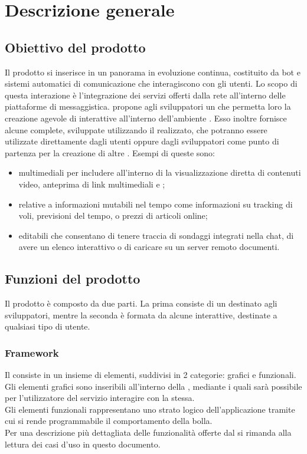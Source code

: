 \section{Descrizione generale}
\subsection{Obiettivo del prodotto}
Il prodotto si inserisce in un panorama in evoluzione continua, costituito da bot e sistemi automatici di comunicazione che interagiscono con gli utenti.
Lo scopo di  questa interazione è l'integrazione dei servizi offerti dalla rete all'interno delle piattaforme di messaggistica. 
\ProjectName{} propone agli sviluppatori un  che permetta loro la creazione agevole di  interattive all'interno dell'ambiente . Esso inoltre fornisce alcune  complete, sviluppate utilizzando il  realizzato, che potranno essere utilizzate direttamente dagli utenti oppure dagli sviluppatori come punto di partenza per la creazione di altre .
Esempi di queste sono: 
\begin{itemize}
	\item {} multimediali per includere all'interno di  la visualizzazione diretta di contenuti video, anteprima di link multimediali e ;
	\item {} relative a informazioni mutabili nel tempo come informazioni su tracking di voli, previsioni del tempo, o prezzi di articoli online;
	\item {} editabili che consentano di tenere traccia di sondaggi integrati nella chat, di avere un elenco interattivo o di caricare su un server remoto documenti.
\end{itemize}

\subsection{Funzioni del prodotto}
Il prodotto è composto da due parti. La prima consiste di un  destinato agli sviluppatori, mentre la seconda è formata da alcune  interattive, destinate a qualsiasi tipo di utente.

\subsubsection{Framework}
Il  consiste in un insieme di elementi, suddivisi in 2 categorie: grafici e funzionali.\\
Gli elementi grafici sono  inseribili all'interno della , mediante i quali sarà possibile per l'utilizzatore del servizio interagire con la  stessa.\\
Gli elementi funzionali rappresentano uno strato logico dell'applicazione tramite cui si rende programmabile il comportamento della bolla.\\
Per una descrizione più dettagliata delle funzionalità offerte dal  si rimanda alla lettura dei casi d'uso in questo documento.

